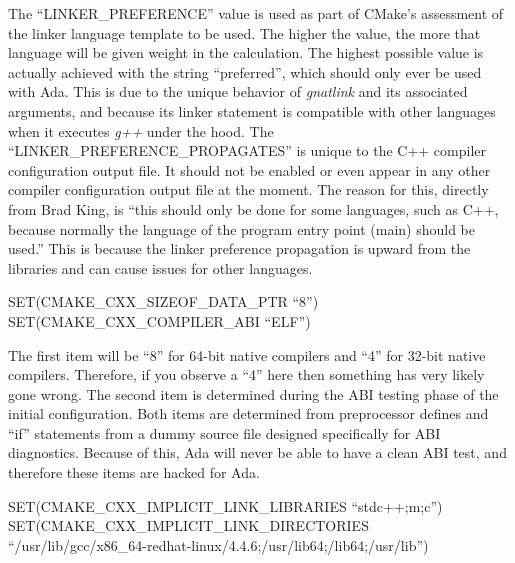 \documentclass[12pt,letterpaper]{article}
\begin{document}
The ``LINKER\_PREFERENCE'' value is used as part of CMake's assessment of the linker language template to be used.  The higher the value, the more that language will be given weight in the calculation.  The highest possible value is actually achieved with the string ``preferred'', which should only ever be used with Ada.  This is due to the unique behavior of \emph{gnatlink} and its associated arguments, and because its linker statement is compatible with other languages when it executes \emph{g++} under the hood.  The ``LINKER\_PREFERENCE\_PROPAGATES'' is unique to the C++ compiler configuration output file.  It should not be enabled or even appear in any other compiler configuration output file at the moment.  The reason for this, directly from Brad King, is ``this should only be done for some languages, such as C++, because normally the language of the program entry point (main) should be used.''  This is because the linker preference propagation is upward from the libraries and can cause issues for other languages.

\begin{shaded}
\noindent SET(CMAKE\_CXX\_SIZEOF\_DATA\_PTR ``8'')\\
SET(CMAKE\_CXX\_COMPILER\_ABI ``ELF'')
\end{shaded}

The first item will be ``8'' for 64-bit native compilers and ``4'' for 32-bit native compilers.  Therefore, if you observe a ``4'' here then something has very likely gone wrong.  The second item is determined during the ABI testing phase of the initial configuration.  Both items are determined from preprocessor defines and ``if'' statements from a dummy source file designed specifically for ABI diagnostics.  Because of this, Ada will never be able to have a clean ABI test, and therefore these items are hacked for Ada.

\begin{shaded}
\noindent SET(CMAKE\_CXX\_IMPLICIT\_LINK\_LIBRARIES ``stdc++;m;c'')\\
SET(CMAKE\_CXX\_IMPLICIT\_LINK\_DIRECTORIES ``/usr/lib/gcc/x86\_64-redhat-linux/4.4.6;/usr/lib64;/lib64;/usr/lib'')
\end{shaded}
\end{document}
